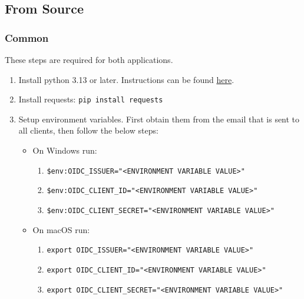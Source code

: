 \documentclass[11pt]{article}
\begin{document}
\subsection{From Source}
\subsubsection{Common}
These steps are required for both applications.

\begin{enumerate}
  \item Install python 3.13 or later. Instructions can be found \href{https://wiki.python.org/moin/BeginnersGuide/Download}{here}.
    \item Install requests: \verb|pip install requests|
  \item Setup environment variables. First obtain them from the email that is sent to all clients, then follow the below steps:
    \begin{itemize}
      \item On Windows run:
        \begin{enumerate}
            \item \verb|$env:OIDC_ISSUER="<ENVIRONMENT VARIABLE VALUE>"|
            \item \verb|$env:OIDC_CLIENT_ID="<ENVIRONMENT VARIABLE VALUE>"|
            \item \verb|$env:OIDC_CLIENT_SECRET="<ENVIRONMENT VARIABLE VALUE>"|
        \end{enumerate}
      \item On macOS run:
        \begin{enumerate}
            \item \verb|export OIDC_ISSUER="<ENVIRONMENT VARIABLE VALUE>"|
            \item \verb|export OIDC_CLIENT_ID="<ENVIRONMENT VARIABLE VALUE>"|
            \item \verb|export OIDC_CLIENT_SECRET="<ENVIRONMENT VARIABLE VALUE>"|
        \end{enumerate}
    \end{itemize}
\end{enumerate}
\end{document}
